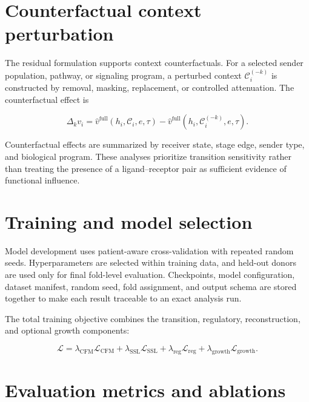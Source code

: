 
\section{Counterfactual context perturbation}

The residual formulation supports context counterfactuals. For a selected sender population, pathway, or signaling program, a perturbed context $\mathcal{C}_i^{(-k)}$ is constructed by removal, masking, replacement, or controlled attenuation. The counterfactual effect is

\begin{equation}
\Delta_{k}v_i
=
\hat{v}^{\mathrm{full}}
\left(h_i,\mathcal{C}_i,e,\tau\right)
-
\hat{v}^{\mathrm{full}}
\left(h_i,\mathcal{C}_i^{(-k)},e,\tau\right).
\end{equation}

Counterfactual effects are summarized by receiver state, stage edge, sender type, and biological program. These analyses prioritize transition sensitivity rather than treating the presence of a ligand--receptor pair as sufficient evidence of functional influence.

\section{Training and model selection}

Model development uses patient-aware cross-validation with repeated random seeds. Hyperparameters are selected within training data, and held-out donors are used only for final fold-level evaluation. Checkpoints, model configuration, dataset manifest, random seed, fold assignment, and output schema are stored together to make each result traceable to an exact analysis run.

The total training objective combines the transition, regulatory, reconstruction, and optional growth components:

\begin{equation}
\mathcal{L}
=
\lambda_{\mathrm{CFM}}\mathcal{L}_{\mathrm{CFM}}
+
\lambda_{\mathrm{SSL}}\mathcal{L}_{\mathrm{SSL}}
+
\lambda_{\mathrm{reg}}\mathcal{L}_{\mathrm{reg}}
+
\lambda_{\mathrm{growth}}\mathcal{L}_{\mathrm{growth}}.
\end{equation}

\section{Evaluation metrics and ablations}

